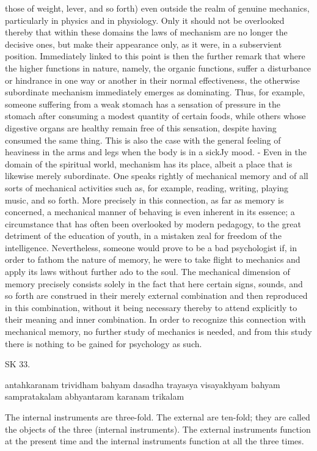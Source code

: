 those of weight, lever, and so forth) even outside the realm of genuine mechanics,
particularly in physics and in physiology. Only it should not be overlooked thereby
that within these domains the laws of mechanism are no longer the decisive ones,
but make their appearance only, as it were, in a subservient position. Immediately
linked to this point is then the further remark that where the higher functions in
nature, namely, the organic functions, suffer a disturbance or hindrance in one
way or another in their normal effectiveness, the otherwise subordinate mechanism
immediately emerges as dominating. Thus, for example, someone suffering from
a weak stomach has a sensation of pressure in the stomach after consuming a
modest quantity of certain foods, while others whose digestive organs are healthy
remain free of this sensation, despite having consumed the same thing. This is
also the case with the general feeling of heaviness in the arms and legs when
the body is in a sickJy mood. - Even in the domain of the spiritual world,
mechanism has its place, albeit a place that is likewise merely subordinate. One
speaks rightly of mechanical memory and of all sorts of mechanical activities such
as, for example, reading, writing, playing music, and so forth. More precisely in
this connection, as far as memory is concerned, a mechanical manner of behaving
is even inherent in its essence; a circumstance that has often been overlooked
by modern pedagogy, to the great detriment of the education of youth, in a
mistaken zeal for freedom of the intelligence. Nevertheless, someone would prove
to be a bad psychologist if, in order to fathom the nature of memory, he were
to take flight to mechanics and apply its laws without further ado to the soul.
The mechanical dimension of memory precisely consists solely in the fact that
here certain signs, sounds, and so forth are construed in their merely external
combination and then reproduced in this combination, without it being necessary
thereby to attend explicitly to their meaning and inner combination. In order to
recognize this connection with mechanical memory, no further study of mechanics
is needed, and from this study there is nothing to be gained for psychology
as such.

SK 33.

antahkaranam trividham bahyam dasadha trayasya visayakhyam
bahyam sampratakalam abhyantaram karanam trikalam

The internal instruments are three-fold.
The external are ten-fold; they are called the objects of the three (internal instruments).
The external instruments function at the present time and
the internal instruments function at all the three times.

